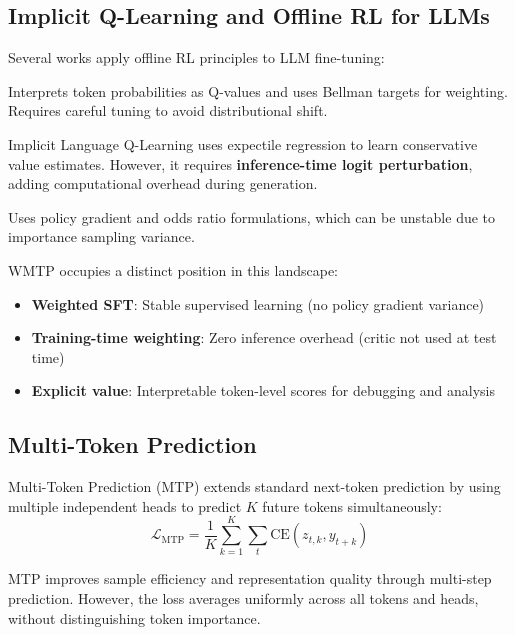 \subsection{Implicit Q-Learning and Offline RL for LLMs}

Several works apply offline RL principles to LLM fine-tuning:

\begin{description}[style=unboxed,leftmargin=0cm]
    \item[Q-SFT:] Interprets token probabilities as Q-values and uses Bellman targets for weighting. Requires careful tuning to avoid distributional shift.

    \item[IQL/ILQL \citep{snell2022offline}:] Implicit Language Q-Learning uses expectile regression to learn conservative value estimates. However, it requires \textbf{inference-time logit perturbation}, adding computational overhead during generation.

    \item[OREO:] Uses policy gradient and odds ratio formulations, which can be unstable due to importance sampling variance.
\end{description}

WMTP occupies a distinct position in this landscape:
\begin{itemize}[nosep]
    \item \textbf{Weighted SFT}: Stable supervised learning (no policy gradient variance)
    \item \textbf{Training-time weighting}: Zero inference overhead (critic not used at test time)
    \item \textbf{Explicit value}: Interpretable token-level scores for debugging and analysis
\end{itemize}

\subsection{Multi-Token Prediction}

Multi-Token Prediction (MTP) \citep{gloeckle2024better} extends standard next-token prediction by using multiple independent heads to predict $K$ future tokens simultaneously:
\begin{equation}
    \mathcal{L}_{\text{MTP}} = \frac{1}{K} \sum_{k=1}^{K} \sum_t \text{CE}(z_{t,k}, y_{t+k})
\end{equation}

MTP improves sample efficiency and representation quality through multi-step prediction. However, the loss averages uniformly across all tokens and heads, without distinguishing token importance.

